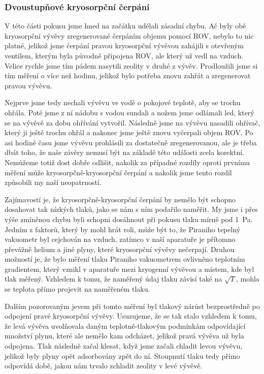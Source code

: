 \documentclass[english]{article}
\begin{document}
	\subsubsection{Dvoustupňové kryosorpční čerpání}
		V této části pokusu jsme hned na začátku udělali zásadní chybu. Ač byly obě kryosorpční vývěvy zregenerované čerpáním objemu pomocí ROV, nebylo to nic platné, jelikož jsme čerpání pravou kryosorpční vývěvou zahájili s otevřeným ventilem, kterým byla původně připojena ROV, ale který už vedl na vzduch. Velice rychle jsme tím pádem nasytili zeolity v druhé z vývěv. Prodloužili jsme si tím měření o více než hodinu, jelikož bylo potřeba znovu zahřát a zregenerovat pravou vývěvu.
		
		Nejprve jsme tedy nechali vývěvu ve vodě o pokojové teplotě, aby se trochu ohřála. Poté jsme z ní nádobu s vodou sundali a nožem jsme odlámali led, který se na vývěvě za dobu ohřívání vytvořil. Následně jsme na vývěvu nasadili ohřívač, který ji ještě trochu ohřál a nakonec jsme ještě znovu vyčerpali objem ROV. Po asi hodině času jsme vývěvu prohlásili za dostatečně zregenerovanou, ale je třeba dbát toho, že naše závěry nemusí být na základě této události zcela korektní. Nemůžeme totiž dost dobře odlišit, nakolik za případné rozdíly oproti prvnímu měření může kryosorpčně-kryosorpční čerpání a nakolik jsme tento rozdíl způsobili my naší neopatrností.
		
		Zajímavostí je, že kryosorpčně-kryosorpční čerpání by nemělo být schopno dosahovat tak nízkých tlaků, jako se nám s ním podařilo naměřit. My jsme i přes výše zmíněnou chybu byli schopni dosáhnout při pokusu tlaku mírně pod 1~Pa. Jedním z faktorů, který by mohl hrát roli, může být to, že Piraniho tepelný vakuometr byl cejchován na vzduch, zatímco v naší aparatuře je přítomno převážně helium a jiné plyny, které kryosorpční vývěvy nečerpají. Druhou možností je, že bylo měření tlaku Piraniho vakuometrem ovlivněno teplotním gradientem, který vznikl v aparatuře mezi kryogenní vývěvou a místem, kde byl tlak měřený. Vzhledem k tomu, že naměřený údaj tlaku závisí také na $\sqrt{T}$, mohla se teplota přímo projevit na naměřeném tlaku. 
	
		Dalším pozorovaným jevem při tomto měření byl tlakový nárůst bezprostředně po odpojení pravé kryosorpční vývěvy. Usuzujeme, že se tak stalo vzhledem k tomu, že levá vývěva uvolňovala daným teplotně-tlakovým podmínkám odpovídající množství plynu, které ale nemělo kam odcházet, jelikož pravá vývěva už byla odpojena. Tlak následně začal klesat, když jsme začali chladit levou vývěvu, jelikož byly plyny opět adsorbovány zpět do ní. Stoupnutí tlaku tedy přímo odpovídá době, jakou nám trvalo zchladit zeolity v levé vývěvě.
	
\end{document}
